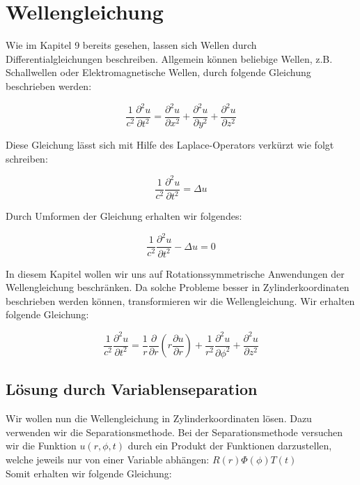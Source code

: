 \section{Wellengleichung}

Wie im Kapitel 9 bereits gesehen, lassen sich Wellen durch Differentialgleichungen beschreiben. Allgemein können beliebige Wellen, z.B. Schallwellen oder Elektromagnetische Wellen, durch folgende Gleichung beschrieben werden:

\begin{equation}
\frac{1}{c^2} \frac{\partial^2 u}{\partial t^2} = \frac{\partial^2 u}{\partial x^2} + \frac{\partial^2 u}{\partial y^2} + \frac{\partial^2 u}{\partial z^2}
\end{equation}

Diese Gleichung lässt sich mit Hilfe des Laplace-Operators verkürzt wie folgt schreiben:

\begin{equation}
\frac{1}{c^2} \frac{\partial^2 u}{\partial t^2} = \Delta u
\end{equation}

Durch Umformen der Gleichung erhalten wir folgendes:

\begin{equation}
\frac{1}{c^2} \frac{\partial^2 u}{\partial t^2} - \Delta u = 0
\end{equation}

In diesem Kapitel wollen wir uns auf Rotationssymmetrische Anwendungen der Wellengleichung beschränken. Da solche Probleme besser in Zylinderkoordinaten beschrieben werden können, transformieren wir die Wellengleichung. Wir erhalten folgende Gleichung:

\begin{equation}
\frac{1}{c^2} \frac{\partial^2 u}{\partial t^2} = \frac{1}{r} \frac{\partial}{\partial r}(r \frac{\partial u}{\partial r}) + \frac{1}{r^2} \frac{\partial^2 u}{\partial \phi^2} + \frac{\partial^2 u}{\partial z^2} 
\end{equation}

\subsection[Variablenseparation]{Lösung durch Variablenseparation}

Wir wollen nun die Wellengleichung in Zylinderkoordinaten lösen. Dazu verwenden wir die Separationsmethode.
Bei der Separationsmethode versuchen wir die Funktion $u(r, \phi, t)$ durch ein Produkt der Funktionen darzustellen, welche jeweils nur von einer Variable abhängen: $R(r)\Phi(\phi)T(t)$
\\Somit erhalten wir folgende Gleichung:


